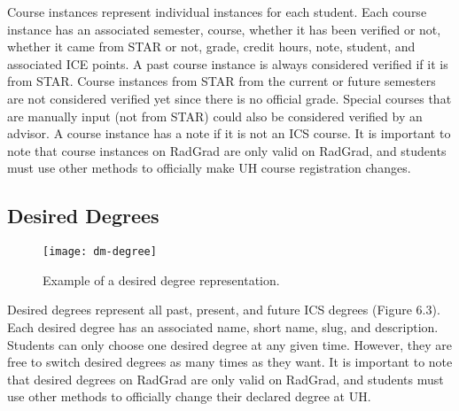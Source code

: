 Course instances represent individual instances for each student. Each course instance has an associated semester, course, whether it has been verified or not, whether it came from STAR or not, grade, credit hours, note, student, and associated ICE points. A past course instance is always considered verified if it is from STAR. Course instances from STAR from the current or future semesters are not considered verified yet since there is no official grade. Special courses that are manually input (not from STAR) could also be considered verified by an advisor. A course instance has a note if it is not an ICS course. It is important to note that course instances on RadGrad are only valid on RadGrad, and students must use other methods to officially make UH course registration changes.

\subsection{Desired Degrees}
\begin{figure}[h]
\centering
\texttt{[image: dm-degree]}
\caption{Example of a desired degree representation.}
\end{figure}
Desired degrees represent all past, present, and future ICS degrees (Figure 6.3). Each desired degree has an associated name, short name, slug, and description. Students can only choose one desired degree at any given time. However, they are free to switch desired degrees as many times as they want. It is important to note that desired degrees on RadGrad are only valid on RadGrad, and students must use other methods to officially change their declared degree at UH. 

